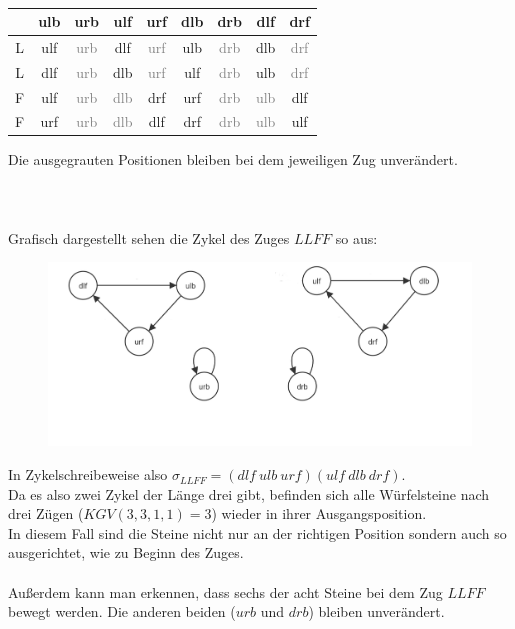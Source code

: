 \documentclass[12pt,a4paper, usenames, dvipsnames]{article}
\begin{document}
\begin{table}[H]
\centering
\begin{tabular}{|c||c|c|c|c|c|c|c|c|}
\hline
 & ulb & urb & ulf & urf & dlb & drb & dlf & drf \\
\hline
\hline
L & ulf & \textcolor{gray}{urb} & dlf & \textcolor{gray}{urf} & ulb & \textcolor{gray}{drb} & dlb & \textcolor{gray}{drf} \\
\hline
L & dlf & \textcolor{gray}{urb} & dlb & \textcolor{gray}{urf} & ulf & \textcolor{gray}{drb} & ulb & \textcolor{gray}{drf} \\
\hline
F & ulf & \textcolor{gray}{urb} & \textcolor{gray}{dlb} & drf & urf & \textcolor{gray}{drb} & \textcolor{gray}{ulb} & dlf \\
\hline
F & urf & \textcolor{gray}{urb} & \textcolor{gray}{dlb} & dlf & drf & \textcolor{gray}{drb} & \textcolor{gray}{ulb} & ulf \\
\hline

\end{tabular}
\caption[Permutationen des Zuges $LLFF$]{}
\end{table}

Die ausgegrauten Positionen bleiben bei dem jeweiligen Zug unverändert. \\
\\ \\
\\
Grafisch dargestellt sehen die Zykel des Zuges $LLFF$ so aus: \\
\begin{figure}[H]
\includegraphics[scale=0.3]{zykel_LLFF.png}
\caption[Zykel des Zuges $LLFF$]{}
\end{figure}

In Zykelschreibeweise also $\sigma_{LLFF}=(dlf \ ulb \ urf)(ulf \ dlb \ drf)$. \\
Da es also zwei Zykel der Länge drei gibt, befinden sich alle Würfelsteine nach drei Zügen ($KGV(3,3,1,1)=3$) wieder in ihrer Ausgangsposition. \\
In diesem Fall sind die Steine nicht nur an der richtigen Position sondern auch so ausgerichtet, wie zu Beginn des Zuges. \\
\\
Außerdem kann man erkennen, dass sechs der acht Steine bei dem Zug $LLFF$ bewegt werden. Die anderen beiden ($urb$ und $drb$) bleiben unverändert. \\
\\
\end{document}
